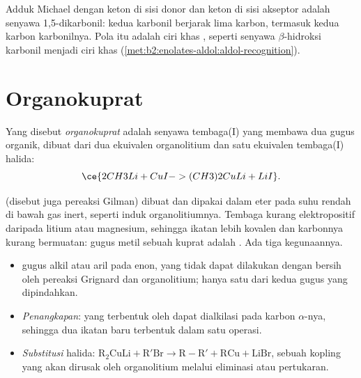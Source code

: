 Adduk Michael dengan keton di sisi donor dan keton di sisi akseptor adalah
senyawa 1,5-dikarbonil: kedua karbonil berjarak lima karbon, termasuk kedua
karbon karbonilnya. Pola itu adalah ciri khas , seperti
senyawa $\beta$-hidroksi karbonil menjadi ciri khas 
(\cref{met:b2:enolates-aldol:aldol-recognition}).

\section{Organokuprat}

\begin{definition}[Organokuprat]\label{def:b2:conjugate-additions:cuprate}
Yang disebut \emph{organokuprat}  adalah
senyawa tembaga(I) yang membawa dua gugus organik, dibuat dari dua
ekuivalen organolitium dan satu ekuivalen tembaga(I) halida:
\begin{equation*}
\ce{2 CH3Li + CuI -> (CH3)2CuLi + LiI}.
\end{equation*}
\end{definition}

 (disebut juga pereaksi Gilman) dibuat dan dipakai dalam eter
pada suhu rendah di bawah gas inert, seperti induk organolitiumnya. Tembaga
kurang elektropositif daripada litium atau magnesium, sehingga ikatan
 lebih kovalen dan karbonnya kurang bermuatan: gugus metil sebuah
kuprat adalah . Ada tiga kegunaannya.

\begin{itemize}
  \item \emph{} gugus alkil atau aril pada enon, yang tidak
        dapat dilakukan dengan bersih oleh pereaksi Grignard dan
        organolitium; hanya satu dari kedua gugus  yang dipindahkan.
  \item \emph{Penangkapan}:  yang terbentuk oleh  dapat
        dialkilasi pada karbon $\alpha$-nya, sehingga dua ikatan 
        baru terbentuk dalam satu operasi.
  \item \emph{Substitusi} halida: $\mathrm{R_2CuLi + R'Br \to R{-}R' + RCu + LiBr}$, sebuah
        kopling yang akan dirusak oleh organolitium melalui eliminasi atau
        pertukaran.
\end{itemize}

